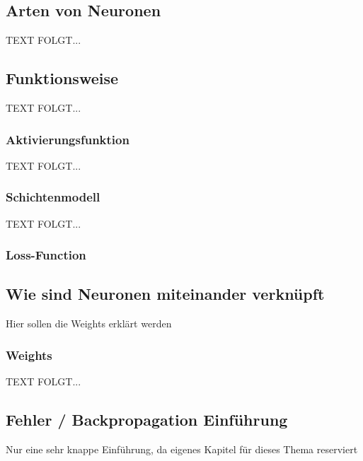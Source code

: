  \subsection{Arten von Neuronen}\label{subsec:neuronen:arten_von_neuronen}
  TEXT FOLGT... 


\newpage
\subsection{Funktionsweise}\label{subsec:neuronen:funktionsweise}
  TEXT FOLGT... 
 

\newpage
\subsubsection{Aktivierungsfunktion}\label{subsec:neuronen:aktivierungsfunktion}
  
  TEXT FOLGT... 


\newpage
\subsubsection{Schichtenmodell}\label{subsec:neuronen:schichtenmodell}
  TEXT FOLGT... 

\subsubsection{Loss-Function}

\newpage 
\subsection{Wie sind Neuronen miteinander verknüpft}\label{subsec:neuronen:verknuepfung_neuronen}  
%
Hier sollen die Weights erklärt werden

\subsubsection{Weights}\label{Weights}
  TEXT FOLGT... 

\subsection{Fehler / Backpropagation Einführung}\label{subsec:neuronen:fehler_backpropagation}
Nur eine sehr knappe Einführung, da eigenes Kapitel für dieses Thema reserviert

